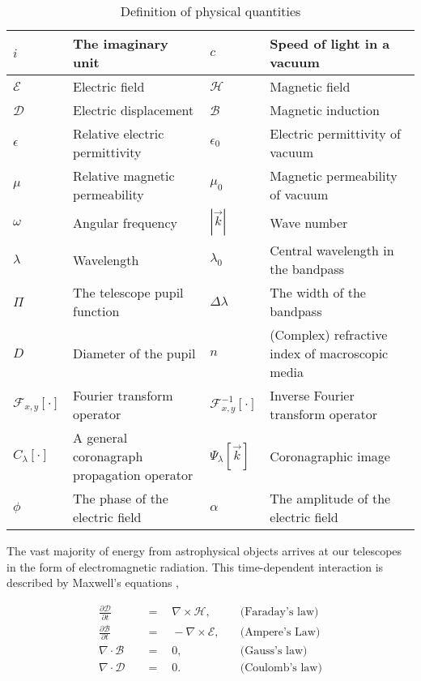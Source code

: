 \documentclass[letterpaper]{ar-1col}
\begin{document}
\begin{table}
\caption{Definition of physical quantities}\label{tab1}
\begin{center}
\begin{tabular}{@{}l|l|l|l@{}}
\hline
$i$ & The imaginary unit & $c$ & Speed of light in a vacuum \\\hline
$\mathcal{E}$ & Electric field & $\mathcal{H}$ & Magnetic field \\\hline
$\mathcal{D}$ & Electric displacement & $\mathcal{B}$ & Magnetic induction \\\hline
$\epsilon$ & Relative electric permittivity & $\epsilon_0$ & Electric permittivity of vacuum \\\hline
$\mu$ & Relative magnetic permeability & $\mu_0$ & Magnetic permeability of vacuum \\\hline
$\omega$ & Angular frequency & $|\vec{k}|$ & Wave number \\\hline
$\lambda$ & Wavelength & $\lambda_0$ & Central wavelength in the bandpass \\\hline
$\Pi$ & The telescope pupil function & $\Delta\lambda$ & The width of the bandpass \\\hline
$D$ & Diameter of the pupil & $n$ & (Complex) refractive index of macroscopic media \\\hline
$\mathcal{F}_{x,y}[\cdot]$ & Fourier transform operator & $\mathcal{F}^{-1}_{x,y}[\cdot]$ & Inverse Fourier transform operator \\\hline
$C_\lambda[\cdot]$ & A general coronagraph propagation operator & $\Psi_\lambda[\vec{k}]$ & Coronagraphic image \\\hline
$\phi$ & The phase of the electric field & $\alpha$ & The amplitude of the electric field \\\hline
\hline
\end{tabular}
\end{center}
\end{table}

The vast majority of energy from astrophysical objects arrives at our telescopes in the form of electromagnetic radiation.
%
This time-dependent interaction is described by Maxwell's equations \citep[with relevant physical quantities defined in Table \ref{tab1} and following ][]{Lavrinenko14},

\begin{equation}
\begin{aligned}
\frac{\partial\mathcal{D}}{\partial t} \quad & = \quad \nabla\times\mathcal{H},   & \quad \text{(Faraday's law)} \\[5pt]
\frac{\partial\mathcal{B}}{\partial t} \quad & = \quad -\nabla\times\mathcal{E},  & \quad \text{(Ampere's Law)}   \\[5pt]
\nabla\cdot\mathcal{B}                 \quad & = \quad 0,                         & \quad \text{(Gauss's law)}   \\[5pt]
\nabla\cdot\mathcal{D}                 \quad & = \quad 0.                         & \quad \text{(Coulomb's law)}
\end{aligned}
\end{equation}
\end{document}
